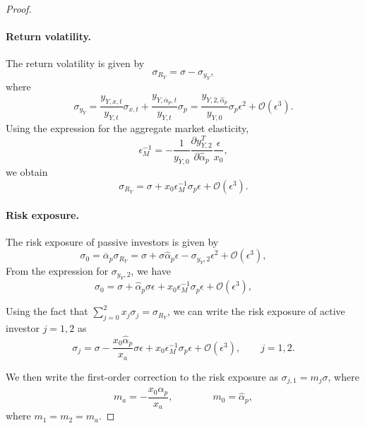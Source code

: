 \begin{proof}
\paragraph{Return volatility.}
The return volatility is given by
\begin{equation}
    \sigma_{R_Y}
    =
    \sigma-\sigma_{y_Y},
\end{equation}
where
\begin{equation}
    \sigma_{y_Y}
    =
    \frac{y_{Y,x,t}}{y_{Y,t}}\sigma_{x,t}
    +
    \frac{y_{Y,\overline{\alpha}_p,t}}{y_{Y,t}}\sigma_p
    =
    \frac{y_{Y,2,\hat{\alpha}_p}}{y_{Y,0}}
    \sigma_p\epsilon^2
    +
    \mathcal O(\epsilon^3).
\end{equation}
Using the expression for the aggregate market elasticity,
\begin{equation}
    \epsilon_M^{-1}
    =
    -\frac{1}{y_{Y,0}}
    \frac{\partial y_{Y,2}^T}{\partial\hat{\alpha}_p}
    \frac{\epsilon}{x_0},
\end{equation}
we obtain
\begin{equation}
    \sigma_{R_Y}
    =
    \sigma
    +
    x_0\epsilon_M^{-1}\sigma_p\epsilon
    +
    \mathcal O(\epsilon^3).
\end{equation}

\paragraph{Risk exposure.} The risk exposure of passive investors is given by
\begin{equation}
    \sigma_0 = \overline{\alpha}_p \sigma_{R_Y} = \sigma + \sigma \hat{\alpha}_p \epsilon - \sigma_{y_Y,2} \epsilon^2 + \mathcal{O}(\epsilon^3), \qquad
\end{equation}
From the expression for $\sigma_{y_Y,2}$, we have
\begin{equation}
    \sigma_0 =  \sigma + \hat{\alpha}_p \sigma \epsilon + x_0\epsilon_M^{-1}\sigma_p\epsilon+ \mathcal{O}(\epsilon^3), \qquad
\end{equation}

Using the fact that $\sum_{j=0}^2 x_j\sigma_j = \sigma_{R_Y}$, we can write the risk exposure of active investor $j=1,2$ as
\begin{equation}
    \sigma_j = \sigma - \frac{x_0\hat{\alpha}_p}{x_a} \sigma  \epsilon +x_0\epsilon_M^{-1}\sigma_p\epsilon + \mathcal{O}(\epsilon^3), \qquad j=1,2.
\end{equation}

We then write the first-order correction to the risk exposure as $\sigma_{j,1}=m_j \sigma$, where
\begin{equation}
    m_{a} = - \frac{x_0\hat{\alpha}_p}{x_a}, \qquad \qquad 
    m_{0} = \hat{\alpha}_p,
\end{equation}
where $m_{1} = m_{2} = m_a$.



\end{proof}
